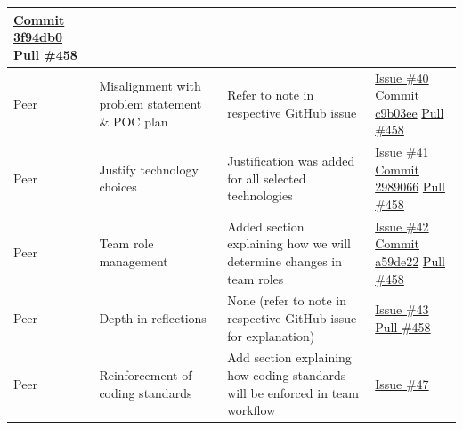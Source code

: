 \documentclass[12pt, titlepage]{article}
\begin{document}
\begin{longtable}{|p{2cm}|p{4cm}|p{5cm}|p{4cm}|}
\newline\href{https://github.com/OmarHassanAdelhamid/Five-of-a-Kind-capstone-project-/pull/458/commits/3f94db0e1390e4da2941a06e8a2ee3bd11095fd5}{Commit 3f94db0}
\newline\href{https://github.com/OmarHassanAdelhamid/Five-of-a-Kind-capstone-project-/pull/458}{Pull \#458} \\ \hline
Peer & Misalignment with problem statement \& POC plan & Refer to note in respective GitHub issue & \href{https://github.com/OmarHassanAdelhamid/Five-of-a-Kind-capstone-project-/issues/40}{Issue \#40}
\newline\href{https://github.com/OmarHassanAdelhamid/Five-of-a-Kind-capstone-project-/pull/458/commits/c9b03ee0ba0e7a01a8508e3a390b4bda4603bc95}{Commit c9b03ee}
\newline\href{https://github.com/OmarHassanAdelhamid/Five-of-a-Kind-capstone-project-/pull/458}{Pull \#458} \\ \hline
Peer & Justify technology choices & Justification was added for all selected technologies & \href{https://github.com/OmarHassanAdelhamid/Five-of-a-Kind-capstone-project-/issues/41}{Issue \#41}
\newline\href{https://github.com/OmarHassanAdelhamid/Five-of-a-Kind-capstone-project-/pull/458/commits/298906661109dc767dd2f90162c44bfa4a8b943e}{Commit 2989066}
\newline\href{https://github.com/OmarHassanAdelhamid/Five-of-a-Kind-capstone-project-/pull/458}{Pull \#458} \\ \hline
Peer & Team role management & Added section explaining how we will determine changes in team roles & \href{https://github.com/OmarHassanAdelhamid/Five-of-a-Kind-capstone-project-/issues/42}{Issue \#42}
\newline\href{https://github.com/OmarHassanAdelhamid/Five-of-a-Kind-capstone-project-/pull/458/commits/a59de22836fe40ed5557f470488e303978f7b7c3}{Commit a59de22}
\newline\href{https://github.com/OmarHassanAdelhamid/Five-of-a-Kind-capstone-project-/pull/458}{Pull \#458} \\ \hline
Peer & Depth in reflections & None (refer to note in respective GitHub issue for explanation) & \href{https://github.com/OmarHassanAdelhamid/Five-of-a-Kind-capstone-project-/issues/43}{Issue \#43}
\newline\href{https://github.com/OmarHassanAdelhamid/Five-of-a-Kind-capstone-project-/pull/458}{Pull \#458} \\ \hline
Peer & Reinforcement of coding standards & Add section explaining how coding standards will be enforced in team workflow & \href{https://github.com/OmarHassanAdelhamid/Five-of-a-Kind-capstone-project-/issues/47}{Issue \#47}

\end{longtable}
\end{document}
